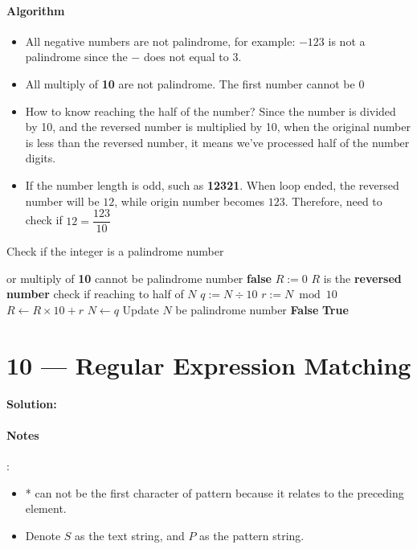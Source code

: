 \documentclass[a4paper,12pt]{article}
\begin{document}
\paragraph{Algorithm}
\begin{itemize}
\item All {\color{red}negative} numbers are not palindrome, for example: $-123$ is not a palindrome since the $-$ does not equal to $3$. 
\item All multiply of \textbf{10} are not palindrome. The first number cannot be {\color{red}0}
\item How to know reaching the {\color{red}half} of the number? Since the number is divided by 10, and the reversed number is multiplied by 10, when the original number is {\color{red}less than} the reversed number, it means we've processed half of the number digits.
\item If the number length is odd, such as \textbf{12321}. When loop ended, the reversed number will be $12$, while origin number becomes $123$. Therefore, need to check if $12 = \dfrac{123}{10}$
\end{itemize}
\setcounter{algorithm}{0}
\begin{algorithm}[H]
\caption{Check if the integer is a palindrome number}
\begin{algorithmic}[1]
\Statex
{}
  or multiply of \textbf{10} cannot be palindrome number
\State \Return \textbf{false} 
\EndIf
\State \textbf{$R := 0$} \Comment $R$ is the \textbf{reversed number}
 \Comment check if reaching to half of $N$
\State $q := N\div 10$
\State $r := N\bmod 10$
\State $R \gets R\times 10 + r$
\State $N\gets q$ \Comment Update $N$
\EndWhile
{}  be palindrome number
\State \Return \textbf{False}
\Else
\State \Return \textbf{True}
\EndIf
\EndProcedure
\Statex
\end{algorithmic}
\end{algorithm}

\section{10 --- Regular Expression Matching}
\textbf{\large{Solution:}}
\par
\noindent
\paragraph{Notes}:
\begin{itemize}
\item {\color{red}*} can not be the first character of pattern because it relates to the {\color{red}preceding} element.
\item Denote $S$ as the text string, and $P$ as the pattern string.
\end{itemize}
\end{document}
